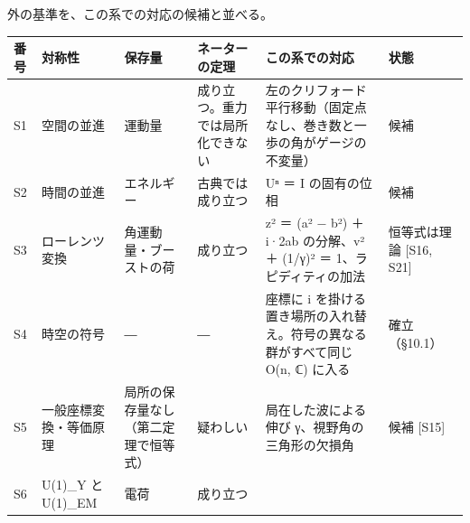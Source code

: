 \documentclass[
  a4paper,
]{ltjsarticle}
\newcounter{none} %
\begin{document}
外の基準を、この系での対応の候補と並べる。

{\def\LTcaptype{none} %
\begin{longtable}[]{@{}
  >{\raggedright\arraybackslash}p{}
  >{\raggedright\arraybackslash}p{}
  >{\raggedright\arraybackslash}p{}
  >{\raggedright\arraybackslash}p{}
  >{\raggedright\arraybackslash}p{}
  >{\raggedright\arraybackslash}p{}@{}}
\toprule\noalign{}
\begin{minipage}[b]{\linewidth}\raggedright
番号
\end{minipage} & \begin{minipage}[b]{\linewidth}\raggedright
対称性
\end{minipage} & \begin{minipage}[b]{\linewidth}\raggedright
保存量
\end{minipage} & \begin{minipage}[b]{\linewidth}\raggedright
ネーターの定理
\end{minipage} & \begin{minipage}[b]{\linewidth}\raggedright
この系での対応
\end{minipage} & \begin{minipage}[b]{\linewidth}\raggedright
状態
\end{minipage} \\
\midrule\noalign{}
\endhead
\bottomrule\noalign{}
\endlastfoot
S1 & 空間の並進 & 運動量 & 成り立つ。重力では局所化できない &
左のクリフォード平行移動（固定点なし、巻き数と一歩の角がゲージの不変量）
& 候補 \\
S2 & 時間の並進 & エネルギー & 古典では成り立つ & Uⁿ ＝ I の固有の位相 &
候補 \\
S3 & ローレンツ変換 & 角運動量・ブーストの荷 & 成り立つ & z² ＝ (a² −
b²) ＋ i·2ab の分解、v² ＋ (1/γ)² ＝ 1、ラピディティの加法 &
恒等式は理論 {[}S16, S21{]} \\
S4 & 時空の符号 & ― & ― & 座標に i
を掛ける置き場所の入れ替え。符号の異なる群がすべて同じ O(n, ℂ) に入る &
確立（§10.1） \\
S5 & 一般座標変換・等価原理 & 局所の保存量なし（第二定理で恒等式） &
疑わしい & 局在した波による伸び γ、視野角の三角形の欠損角 & 候補
{[}S15{]} \\
S6 & U(1)\_Y と U(1)\_EM & 電荷 & 成り立つ &

\end{longtable}}
\end{document}
